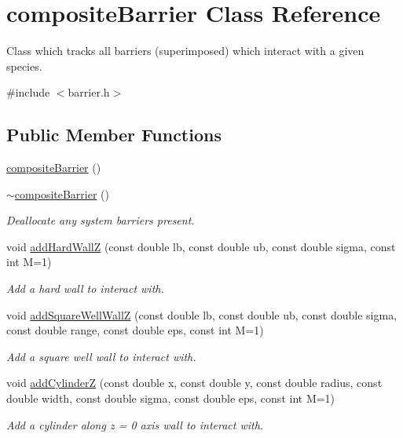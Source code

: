 \hypertarget{classcomposite_barrier}{\section{composite\-Barrier Class Reference}
\label{classcomposite_barrier}
}


Class which tracks all barriers (superimposed) which interact with a given species.  




{\ttfamily \#include $<$barrier.\-h$>$}

\subsection*{Public Member Functions}
\begin{DoxyCompactItemize}
\item 
\hyperlink{classcomposite_barrier_a84b553543dddd5177980f5e5a5616af3}{composite\-Barrier} ()
\item 
\hyperlink{classcomposite_barrier_a1362afbee9253343a95734b10953ccee}{$\sim$composite\-Barrier} ()
\begin{DoxyCompactList}\small\item\em Deallocate any system barriers present. \end{DoxyCompactList}\item 
void \hyperlink{classcomposite_barrier_a10e7f2561e3b5167b69ead011dde2e75}{add\-Hard\-Wall\-Z} (const double lb, const double ub, const double sigma, const int M=1)
\begin{DoxyCompactList}\small\item\em Add a hard wall to interact with. \end{DoxyCompactList}\item 
void \hyperlink{classcomposite_barrier_a3cb5df17c75d9ff8ccc44b806871b449}{add\-Square\-Well\-Wall\-Z} (const double lb, const double ub, const double sigma, const double range, const double eps, const int M=1)
\begin{DoxyCompactList}\small\item\em Add a square well wall to interact with. \end{DoxyCompactList}\item 
void \hyperlink{classcomposite_barrier_afd40edf14705cf306c72120bb8a59042}{add\-Cylinder\-Z} (const double x, const double y, const double radius, const double width, const double sigma, const double eps, const int M=1)
\begin{DoxyCompactList}\small\item\em Add a cylinder along z = 0 axis wall to interact with. \end{DoxyCompactList}\item 

\end{DoxyCompactItemize}
